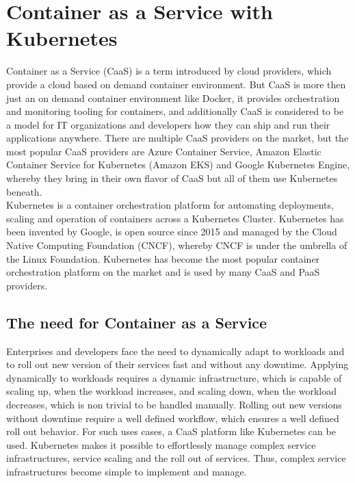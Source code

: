 \chapter{Container as a Service with Kubernetes}
\label{cha:caas}
Container as a Service (CaaS) is a term introduced by cloud providers, which provide a cloud based on demand container environment. But CaaS is more then just an on demand container environment like Docker, it provides orchestration and monitoring tooling for containers, and additionally CaaS is considered to be a model for IT organizations and developers how they can ship and run their applications anywhere. There are multiple CaaS providers on the market, but the most popular CaaS providers are Azure Container Service, Amazon Elastic Container Service for Kubernetes (Amazon EKS) and Google Kubernetes Engine, whereby they bring in their own flavor of CaaS but all of them use Kubernetes beneath\cite{CNCFKubernetes2018, MicrosoftAzureAKS2018, AmazonWebServicesEKS2018, GoogleCloudKE2018}. \\

Kubernetes is a container orchestration platform for automating deployments, scaling and operation of containers across a Kubernetes Cluster. Kubernetes has been invented by Google, is open source since 2015 and managed by the Cloud Native Computing Foundation (CNCF), whereby CNCF is under the umbrella of the Linux Foundation. Kubernetes has become the most popular container orchestration platform on the market and is used by many CaaS and PaaS providers\cite{CNCF2018}.

\section{The need for Container as a Service}
\label{sec:caas-need-for-caas}
Enterprises and developers face the need to dynamically adapt to workloads and to roll out new version of their services fast and without any downtime. Applying dynamically to workloads requires a dynamic infrastructure, which is capable of scaling up, when the workload increases, and scaling down, when the workload decreases, which is non trivial to be handled manually. Rolling out new versions without downtime require a well defined workflow, which ensures a well defined roll out behavior. For such uses cases, a CaaS platform like Kubernetes can be used. Kubernetes makes it possible to effortlessly manage complex service infrastructures, service scaling and the roll out of services. Thus, complex service infrastructures become simple to implement and manage. \\

